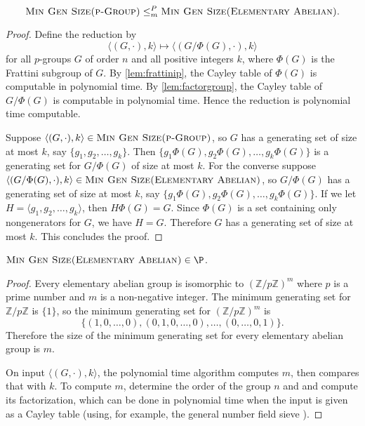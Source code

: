 \documentclass{article}
\newcommand{\gen}[1]{{\langle #1 \rangle}}
\begin{document}
\begin{proposition}
  \begin{equation*}
    \textsc{Min Gen Size(p-Group)} \leq_m^P \textsc{Min Gen Size(Elementary Abelian)}.
  \end{equation*}
\end{proposition}
\begin{proof}
  Define the reduction by
  \begin{equation*}
    \langle (G, \cdot), k \rangle \mapsto \langle (G / \Phi(G), \cdot), k \rangle
  \end{equation*}
  for all $p$-groups $G$ of order $n$ and all positive integers $k$, where $\Phi(G)$ is the Frattini subgroup of $G$.
  By \autoref{lem:frattinip}, the Cayley table of $\Phi(G)$ is computable in polynomial time.
  By \autoref{lem:factorgroup}, the Cayley table of $G / \Phi(G)$ is computable in polynomial time.
  Hence the reduction is polynomial time computable.

  Suppose $\langle (G, \cdot), k \rangle \in \textsc{Min Gen Size(p-Group)}$, so $G$ has a generating set of size at most $k$, say $\{g_1, g_2, \dotsc, g_k\}$.
  Then $\{g_1\Phi(G), g_2\Phi(G), \dotsc, g_k\Phi(G)\}$ is a generating set for $G / \Phi(G)$ of size at most $k$.
  For the converse suppose $\langle (G / \Phi(G), \cdot), k \rangle \in \textsc{Min Gen Size(Elementary Abelian)}$, so $G / \Phi(G)$ has a generating set of size at most $k$, say $\{g_1\Phi(G), g_2\Phi(G), \dotsc, g_k\Phi(G)\}$.
  If we let $H = \gen{g_1, g_2, \dotsc, g_k}$, then $H \Phi(G) = G$.
  Since $\Phi(G)$ is a set containing only nongenerators for $G$, we have $H = G$.
  Therefore $G$ has a generating set of size at most $k$.
  This concludes the proof.
\end{proof}

\begin{lemma}
  $\textsc{Min Gen Size(Elementary Abelian)} \in \P$.
\end{lemma}
\begin{proof}
  Every elementary abelian group is isomorphic to $(\mathbb{Z} / p\mathbb{Z})^m$ where $p$ is a prime number and $m$ is a non-negative integer.
  The minimum generating set for $\mathbb{Z} / p\mathbb{Z}$ is $\{1\}$, so the minimum generating set for $(\mathbb{Z} / p\mathbb{Z})^m$ is
  \[
  \{(1, 0, \dotsc, 0), (0, 1, 0, \dotsc, 0), \dotsc, (0, \dotsc, 0, 1)\}.
  \]
  Therefore the size of the minimum generating set for every elementary abelian group is $m$.

  On input $\langle (G, \cdot), k \rangle$, the polynomial time algorithm computes $m$, then compares that with $k$.
  To compute $m$, determine the order of the group $n$ and and compute its factorization, which can be done in polynomial time when the input is given as a Cayley table (using, for example, the general number field sieve \cite{llmp93}).
\end{proof}
\end{document}
